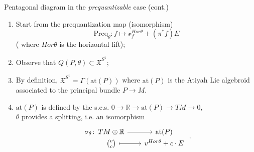 \documentclass[10pt]{beamer}
\providecommand{\vHam}{\mathscr{v}}
\begin{document}
\begin{frame}[fragile]{Pentagonal diagram in the \emph{prequantizable} case \hfill (cont.)}
	\begin{center}
			
	\end{center}	
	\vfill
	\begin{enumerate}
		\item<2-> Start from the prequantization map (isomorphism)
					$$\textrm{Preq}_\theta: f \mapsto \vHam_f^{Hor \theta} + (\pi^\ast f ) E $$
					\hfill {\tiny ( where $Hor \theta$ is the horizontal lift);}
		\item<3-> Observe that $Q(P,\theta) \subset \mathfrak{X}^{S^1}$;
		\item<4-> By definition, $\mathfrak{X}^{S^1}= \Gamma(\textrm{at}(P))$ where $\textrm{at}(P)$ is the Atiyah Lie algebroid associated to the principal bundle $P\to M$.
		\item<5-> $\textrm{at}(P)$ is defined by the s.e.s. $0\to \mathbb{R} \to \textrm{at}(P) \to TM \to 0$,
		\\ $\theta$ provides a splitting, i.e. an isomorphism
		\begin{displaymath}
			\morphism{\sigma_\theta}{TM\oplus \mathbb{R}}{\textrm{at}(P)}
			{\binom{v}{c}}{v^{Hor \theta} + c \cdot E}~.
		\end{displaymath}
	\end{enumerate}
	
	\hfill {}%
\end{frame}
\end{document}
